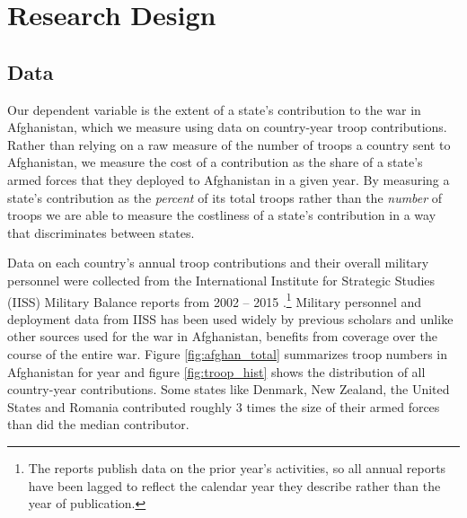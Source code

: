 \documentclass[12pt,letterpaper]{article}
\begin{document}
\section{Research Design}
	\subsection{Data}
		
		Our dependent variable is the extent of a state's contribution to the war in Afghanistan, which we measure using data on country-year troop contributions. Rather than relying on a raw measure of the number of troops a country sent to Afghanistan, we measure the cost of a contribution as the share of a state's armed forces that they deployed to Afghanistan in a given year. By measuring a state's contribution as the \emph{percent} of its total troops rather than the \emph{number} of troops we are able to measure the costliness of a state's contribution in a way that discriminates between states. 
		
		Data on each country's annual troop contributions and their overall military personnel were collected from the International Institute for Strategic Studies (IISS) Military Balance reports from 2002 -- 2015 \citep{internationalinstituteforstrategicstudies_militarybalance_}.\footnote{The reports publish data on the prior year's activities, so all annual reports have been lagged to reflect the calendar year they describe rather than the year of publication.} Military personnel and deployment data from IISS has been used widely by previous scholars \citep[e.g.][]{walter_buildingreputationwhy_2006, rovner_hegemonyforceposture_2014, beckley_emergingmilitarybalance_2017, henke_politicsdiplomacyhow_2017} and unlike other sources used for the war in Afghanistan, benefits from coverage over the course of the entire war. Figure \ref{fig:afghan_total} summarizes troop numbers in Afghanistan for year and figure \ref{fig:troop_hist} shows the distribution of all country-year contributions. Some states like Denmark, New Zealand, the United States and Romania contributed roughly 3 times the size of their armed forces than did the median contributor. 
\end{document}
